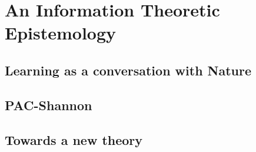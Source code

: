 \chapter{An Information Theoretic Epistemology}\label{ch:it_epistemology}

\section{Learning as a conversation with Nature}
\section{PAC-Shannon}
\section{Towards a new theory}
